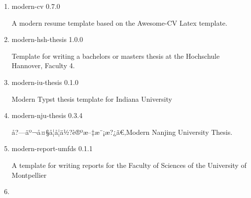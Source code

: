 \begin{enumerate}
  { modern-cug-thesis } { 0.1.0 }

  ä¸­å›½åœ°è´¨å¤§å­¦ï¼ˆæ­¦æ±‰ï¼‰å­¦ä½?è®ºæ--‡æ¨¡æ?¿ã€‚China University of
  Geosciences Thesis based on Typst.
\item
  \href{/universe/package/modern-cv/}{}


  { modern-cv } { 0.7.0 }

  A modern resume template based on the Awesome-CV Latex template.
\item
  \href{/universe/package/modern-hsh-thesis/}{}


  { modern-hsh-thesis } { 1.0.0 }

  Template for writing a bachelors or masters thesis at the Hochschule
  Hannover, Faculty 4.
\item
  \href{/universe/package/modern-iu-thesis/}{}


  { modern-iu-thesis } { 0.1.0 }

  Modern Typst thesis template for Indiana University
\item
  \href{/universe/package/modern-nju-thesis/}{}


  { modern-nju-thesis } { 0.3.4 }

  å?---äº¬å¤§å­¦å­¦ä½?è®ºæ--‡æ¨¡æ?¿ã€‚Modern Nanjing University Thesis.
\item
  \href{/universe/package/modern-report-umfds/}{}


  { modern-report-umfds } { 0.1.1 }

  A template for writing reports for the Faculty of Sciences of the
  University of Montpellier
\item
  \href{/universe/package/modern-resume/}{}


\end{enumerate}

